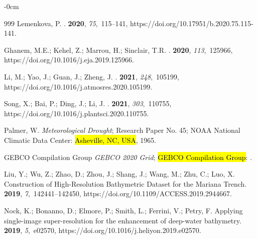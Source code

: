 \documentclass[geosciences,article,accept,pdftex,oneauthor]{Definitions/mdpi}
\begin{document}
\begin{adjustwidth}{-\extralength}{0cm}
\begin{thebibliography}{999}
Lemenkova, P.
.
 {\bf 2020}, {\em
  75},~115--141, https://doi.org/10.17951/b.2020.75.115-141.

Ghanem, M.E.; Kehel, Z.; Marrou, H.; Sinclair, T.R.
.
 {\bf 2020}, {\em 113},~125966, https://doi.org/10.1016/j.eja.2019.125966.

Li, M.; Yao, J.; Guan, J.; Zheng, J.
.
 {\bf 2021}, {\em 248},~105199, https://doi.org/10.1016/j.atmosres.2020.105199.

Song, X.; Bai, P.; Ding, J.; Li, J.
.
 {\bf 2021}, {\em 303},~110755, https://doi.org/10.1016/j.plantsci.2020.110755.

Palmer, W.
\newblock \emph{Meteorological Drought};  Research Paper No. 45;
\newblock NOAA National Climatic Data Center: \hl{Asheville, NC, USA},  1965.


GEBCO Compilation Group
\newblock \emph{GEBCO 2020 Grid}; \hl{GEBCO Compilation Group}: 
.%

Liu, Y.; Wu, Z.; Zhao, D.; Zhou, J.; Shang, J.; Wang, M.; Zhu, C.; Luo, X.
\newblock Construction of High-Resolution Bathymetric Dataset for the Mariana
  Trench.
 {\bf 2019}, {\em 7},~142441--142450, https://doi.org/10.1109/ACCESS.2019.2944667.

Nock, K.; Bonanno, D.; Elmore, P.; Smith, L.; Ferrini, V.; Petry, F.
\newblock Applying single-image super-resolution for the enhancement of
  deep-water bathymetry.
 {\bf 2019}, {\em 5},~e02570, https://doi.org/10.1016/j.heliyon.2019.e02570.


\end{thebibliography}
\end{adjustwidth}
\end{document}
